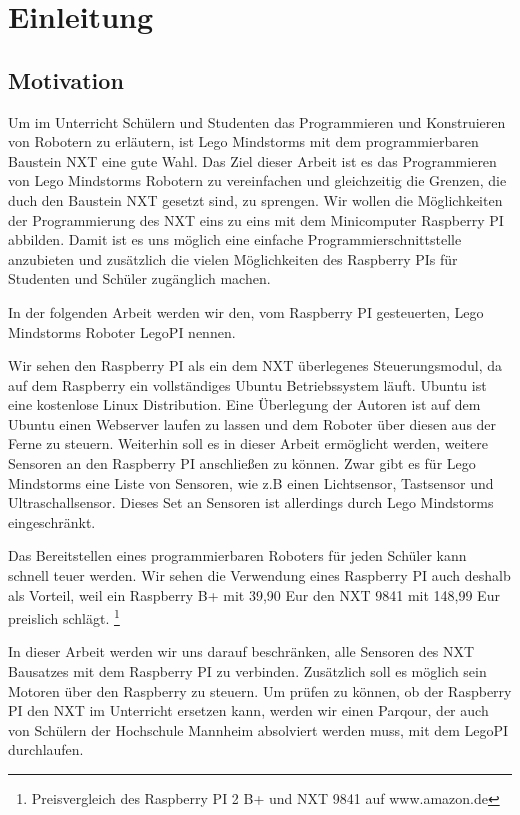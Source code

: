 \chapter{Einleitung}

\section{Motivation}
Um im Unterricht Schülern und Studenten das Programmieren und Konstruieren von Robotern zu erläutern, ist Lego Mindstorms mit dem programmierbaren Baustein NXT eine gute Wahl. Das Ziel dieser Arbeit ist es das Programmieren von Lego Mindstorms Robotern zu vereinfachen und gleichzeitig die Grenzen, die duch den Baustein NXT gesetzt sind, zu sprengen. Wir wollen die Möglichkeiten der Programmierung des NXT eins zu eins mit dem Minicomputer Raspberry PI abbilden. Damit ist es uns möglich eine einfache Programmierschnittstelle anzubieten und zusätzlich die vielen Möglichkeiten des Raspberry PIs für Studenten und Schüler zugänglich machen. 

In der folgenden Arbeit werden wir den, vom Raspberry PI gesteuerten, Lego Mindstorms Roboter LegoPI nennen.

Wir sehen den Raspberry PI als ein dem NXT überlegenes Steuerungsmodul, da auf dem Raspberry ein vollständiges Ubuntu Betriebssystem läuft. Ubuntu ist eine kostenlose Linux Distribution. Eine Überlegung der Autoren ist auf dem Ubuntu einen Webserver laufen zu lassen und dem Roboter über diesen aus der Ferne zu steuern.
Weiterhin soll es in dieser Arbeit ermöglicht werden, weitere Sensoren an den Raspberry PI anschließen zu können. Zwar gibt es für Lego Mindstorms eine Liste von Sensoren, wie z.B einen Lichtsensor, Tastsensor und Ultraschallsensor. Dieses Set an Sensoren ist allerdings durch Lego Mindstorms eingeschränkt.

Das Bereitstellen eines programmierbaren Roboters für jeden Schüler kann schnell teuer werden. Wir sehen die Verwendung eines Raspberry PI auch deshalb als Vorteil, weil ein Raspberry B+ mit 39,90 Eur den NXT 9841 mit 148,99 Eur preislich schlägt. \footnote{Preisvergleich des Raspberry PI 2 B+ und NXT 9841 auf www.amazon.de}

In dieser Arbeit werden wir uns darauf beschränken, alle Sensoren des NXT Bausatzes mit dem Raspberry PI zu verbinden. Zusätzlich soll es möglich sein Motoren über den Raspberry zu steuern. Um prüfen zu können, ob der Raspberry PI den NXT im Unterricht ersetzen kann, werden wir einen Parqour, der auch von Schülern der Hochschule Mannheim absolviert werden muss, mit dem LegoPI durchlaufen.

